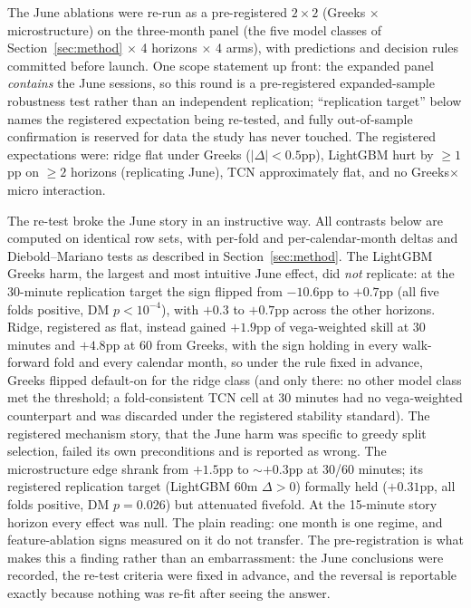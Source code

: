 \documentclass[11pt]{article}
\begin{document}
The June ablations were re-run as a pre-registered $2\times2$
(Greeks $\times$ microstructure) on the three-month panel (the five model classes of Section~\ref{sec:method} $\times$ 4 horizons $\times$ 4 arms), with predictions and decision rules committed before launch. One scope
statement up front: the expanded panel \emph{contains} the June sessions,
so this round is a pre-registered expanded-sample robustness test rather
than an independent replication; ``replication target'' below names the
registered expectation being re-tested, and fully out-of-sample
confirmation is reserved for data the study has never touched. The registered
expectations were: ridge flat under Greeks ($|\Delta| < 0.5$pp), LightGBM
hurt by $\geq 1$pp on $\geq 2$ horizons (replicating June), TCN
approximately flat, and no Greeks$\times$micro interaction.

The re-test broke the June story in an instructive way. All contrasts
below are computed on identical row sets, with per-fold and per-calendar-month
deltas and Diebold--Mariano tests as described in
Section~\ref{sec:method}. The LightGBM
Greeks harm, the largest and most intuitive June effect, did
\emph{not} replicate: at the 30-minute replication target the sign flipped
from $-10.6$pp to $+0.7$pp (all five folds positive, DM $p<10^{-4}$), with
$+0.3$ to $+0.7$pp across the other horizons. Ridge, registered as flat,
instead gained $+1.9$pp of vega-weighted skill at 30 minutes and $+4.8$pp at
60 from Greeks, with the sign holding in every walk-forward fold and every
calendar month, so under the rule fixed in advance, Greeks flipped
default-on for the ridge class (and only there: no other model class met the
threshold; a fold-consistent TCN cell at 30 minutes had no vega-weighted
counterpart and was discarded under the registered stability standard). The
registered mechanism story, that the June harm was specific to greedy split selection, failed its own preconditions and is reported as wrong.
The microstructure edge shrank from $+1.5$pp to $\sim$$+0.3$pp at 30/60
minutes; its registered replication target (LightGBM 60m $\Delta > 0$)
formally held ($+0.31$pp, all folds positive, DM $p=0.026$) but attenuated
fivefold. At the 15-minute story horizon every effect was null. The plain
reading: one month is one regime, and feature-ablation signs measured on it
do not transfer. The pre-registration is what makes this a finding rather
than an embarrassment: the June conclusions were recorded, the re-test
criteria were fixed in advance, and the reversal is reportable exactly
because nothing was re-fit after seeing the answer.
\end{document}
